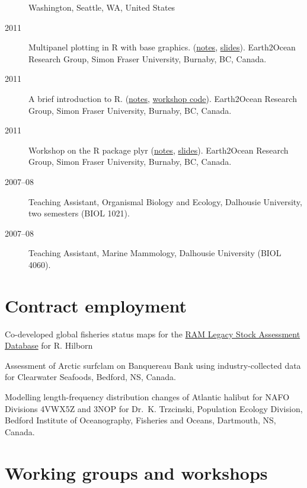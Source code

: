 \begin{description}
Washington, Seattle, WA, United States
\item[2011]
Multipanel plotting in R with base graphics.
(\href{http://seananderson.ca/courses/11-multipanel/multipanel.pdf}{notes},
\href{http://seananderson.ca/courses/11-multipanel/multipanel-slides.pdf}{slides}).
Earth2Ocean Research Group, Simon Fraser University, Burnaby, BC,
Canada.
\item[2011]
A brief introduction to R.
(\href{http://seananderson.ca/courses/11-rintro/RIntro.pdf}{notes},
\href{http://seananderson.ca/courses/11-rintro/RIntro.R}{workshop
code}). Earth2Ocean Research Group, Simon Fraser University, Burnaby,
BC, Canada.
\item[2011]
Workshop on the R package plyr
(\href{http://seananderson.ca/courses/11-plyr/plyr.pdf}{notes},
\href{http://seananderson.ca/courses/11-plyr/plyr-slides.pdf}{slides}).
Earth2Ocean Research Group, Simon Fraser University, Burnaby, BC,
Canada.
\item[2007--08]
Teaching Assistant, Organismal Biology and Ecology, Dalhousie
University, two semesters (BIOL 1021).
\item[2007--08]
Teaching Assistant, Marine Mammology, Dalhousie University (BIOL 4060).
\end{description}

\section{Contract employment}\label{contract-employment}

\begin{description}
\itemsep3pt\parskip0pt
\item[2013]
Co-developed global fisheries status maps for the
\href{http://ramlegacy.org/}{RAM Legacy Stock Assessment Database} for
R. Hilborn
\item[2010]
Assessment of Arctic surfclam on Banquereau Bank using
industry-collected data for Clearwater Seafoods, Bedford, NS, Canada.
\item[2010]
Modelling length-frequency distribution changes of Atlantic halibut for
NAFO Divisions 4VWX5Z and 3NOP for Dr.\ K. Trzcinski, Population Ecology
Division, Bedford Institute of Oceanography, Fisheries and Oceans,
Dartmouth, NS, Canada.
\end{description}

\section{Working groups and
workshops}\label{working-groups-and-workshops}

